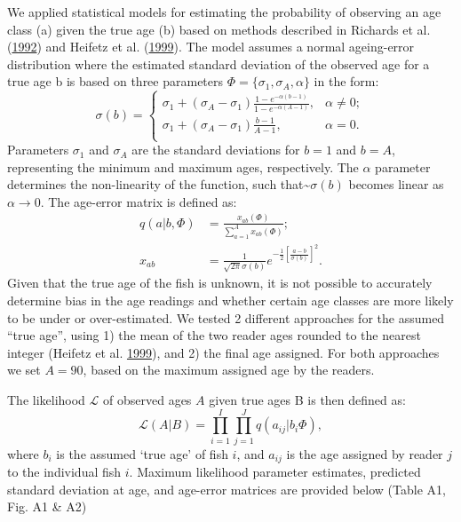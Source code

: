 \documentclass[11pt]{book}
\begin{document}
We applied statistical models for estimating the probability of observing an age class (a) given the true age (b) based on methods described in Richards et al. (\protect\hyperlink{ref-richards1992statistical}{1992}) and Heifetz et al. (\protect\hyperlink{ref-heifetz1999age}{1999}). The model assumes a normal ageing-error distribution where the estimated standard deviation of the observed age for a true age b is based on three parameters \(\Phi = \{ \sigma_1, \sigma_A, \alpha \}\) in the form:
\begin{equation}
\sigma(b) = \left\{
    \begin{array}{ll}
        \sigma_1 + (\sigma_A - \sigma_1) \frac{1 - e^{-\alpha(b - 1)} }{1 - e^{-\alpha(A - 1)}}, & \alpha \neq 0; \\
        \sigma_1 + (\sigma_A - \sigma_1) \frac{b-1}{A-1}, & \alpha = 0.\\
    \end{array} \right.
\end{equation}
Parameters \(\sigma_1\) and \(\sigma_A\) are the standard deviations for \(b=1\) and \(b=A\), representing the minimum and maximum ages, respectively. The \(\alpha\) parameter determines the non-linearity of the function, such that\textasciitilde{}\(\sigma(b)\) becomes linear as \(\alpha \rightarrow 0\). The age-error matrix is defined as:
\begin{align}
q(a \vert b, \Phi) &= \frac{x_{ab}(\Phi)}{\sum_{a = 1}^A x_{ab}(\Phi) }; \\
x_{ab} &= \frac{1}{\sqrt{2\pi}\sigma(b)} e^{-\frac12 \left[ \frac{a-b}{\sigma(b)} \right]^2}.
\end{align}
Given that the true age of the fish is unknown, it is not possible to accurately determine bias in the age readings and whether certain age classes are more likely to be under or over-estimated. We tested 2 different approaches for the assumed ``true age'', using 1) the mean of the two reader ages rounded to the nearest integer (Heifetz et al. \protect\hyperlink{ref-heifetz1999age}{1999}), and 2) the final age assigned. For both approaches we set \(A=90\), based on the maximum assigned age by the readers.

The likelihood \(\mathcal{L}\) of observed ages \(A\) given true ages B is then defined as:
\begin{equation}
\mathcal{L}(A \vert B) = \prod_{i = 1}^I \prod_{j = 1}^J q(a_{ij} \vert b_i \Phi),
\end{equation}
where \(b_i\) is the assumed `true age' of fish \(i\), and \(a_{ij}\) is the age assigned by reader \(j\) to the individual fish \(i\). Maximum likelihood parameter estimates, predicted standard deviation at age, and age-error matrices are provided below (Table A1, Fig. A1 \& A2)
\end{document}
